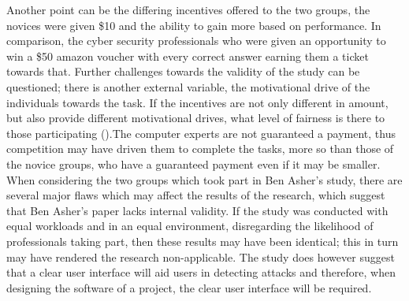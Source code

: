Another point can be the differing incentives offered to the two groups, the novices were given \$10 and the ability to gain more based on performance. In comparison, the cyber security professionals who were given an opportunity to win a \$50 amazon voucher with every correct answer earning them a ticket towards that. Further challenges towards the validity of the study can be questioned; there is another external variable, the motivational drive of the individuals towards the task. If the incentives are not only different in amount, but also provide different motivational drives, what level of fairness is there to those participating (\cite{Incentives}).The computer experts are not guaranteed a payment, thus competition may have driven them to complete the tasks, more so than those of the novice groups, who have a guaranteed payment even if it may be smaller. 
When considering the two groups which took part in Ben Asher's study, there are several major flaws which may affect the results of the research, which suggest that Ben Asher's paper lacks internal validity.  If the study was conducted with equal workloads and in an equal environment, disregarding the likelihood of professionals taking part, then these results may have been identical; this in turn may have rendered the research non-applicable. The study does however suggest that a clear user interface will aid users in detecting attacks and therefore, when designing the software of a project, the clear user interface will be required.



